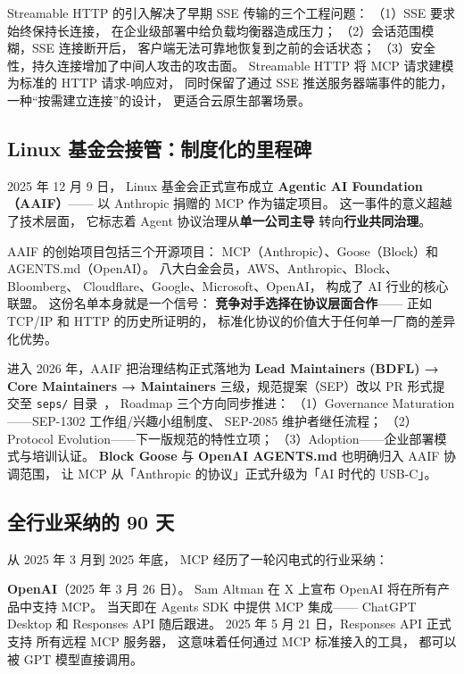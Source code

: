 Streamable HTTP 的引入解决了早期 SSE 传输的三个工程问题：
（1）SSE 要求始终保持长连接，
在企业级部署中给负载均衡器造成压力；
（2）会话范围模糊，SSE 连接断开后，
客户端无法可靠地恢复到之前的会话状态；
（3）安全性，持久连接增加了中间人攻击的攻击面。
Streamable HTTP 将 MCP 请求建模为标准的 HTTP 请求-响应对，
同时保留了通过 SSE 推送服务器端事件的能力，
一种“按需建立连接”的设计，
更适合云原生部署场景。

\subsection{Linux 基金会接管：制度化的里程碑}

2025 年 12 月 9 日，
Linux 基金会正式宣布成立 \textbf{Agentic AI Foundation（AAIF）}——
以 Anthropic 捐赠的 MCP 作为锚定项目。
这一事件的意义超越了技术层面，
它标志着 Agent 协议治理从\textbf{单一公司主导}
转向\textbf{行业共同治理}。

AAIF 的创始项目包括三个开源项目：
MCP（Anthropic）、Goose（Block）和 AGENTS.md（OpenAI）。
八大白金会员，AWS、Anthropic、Block、Bloomberg、
Cloudflare、Google、Microsoft、OpenAI，
构成了 AI 行业的核心联盟。
这份名单本身就是一个信号：
\textbf{竞争对手选择在协议层面合作}——
正如 TCP/IP 和 HTTP 的历史所证明的，
标准化协议的价值大于任何单一厂商的差异化优势。

进入 2026 年，AAIF 把治理结构正式落地为
\textbf{Lead Maintainers (BDFL) → Core Maintainers → Maintainers}
三级，规范提案（SEP）改以 PR 形式提交至 \texttt{seps/} 目录~\cite{aaif2026foundation}，
Roadmap 三个方向同步推进：
（1）Governance Maturation——SEP-1302 工作组/兴趣小组制度、
SEP-2085 维护者继任流程；
（2）Protocol Evolution——下一版规范的特性立项；
（3）Adoption——企业部署模式与培训认证。
\textbf{Block Goose} 与 \textbf{OpenAI AGENTS.md}
也明确归入 AAIF 协调范围，
让 MCP 从「Anthropic 的协议」正式升级为「AI 时代的 USB-C」。

\subsection{全行业采纳的 90 天}

从 2025 年 3 月到 2025 年底，
MCP 经历了一轮闪电式的行业采纳：

\textbf{OpenAI}（2025 年 3 月 26 日）。
Sam Altman 在 X 上宣布 OpenAI 将在所有产品中支持 MCP。
当天即在 Agents SDK 中提供 MCP 集成——
ChatGPT Desktop 和 Responses API 随后跟进。
2025 年 5 月 21 日，Responses API 正式支持
所有远程 MCP 服务器，
这意味着任何通过 MCP 标准接入的工具，
都可以被 GPT 模型直接调用。

